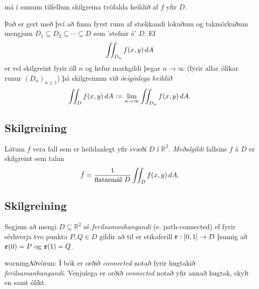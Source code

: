 \documentclass[a4paper,10pt,icelandic]{sphinxmanual}
\begin{document}
má í sumum tilfellum skilgreina tvöfalda heildið af \(f\) yfir
\(D\).

Það er gert með því að finna fyrst runu af stækkandi lokuðum og
takmörkuðum mengjum
\(D_1 \subseteq D_2 \subseteq \cdots \subseteq D\) sem ’stefnir á’
\(D\). Ef
\begin{gather}
\begin{split}\displaystyle \int\!\!\!\int_{D_n} f(x,y)\,dA\end{split}\notag
\end{gather}
er vel skilgreint fyrir öll \(n\) og hefur markgildi þegar
\(n\to \infty\) (fyrir allar ólíkar runur \((D_n)_{n\geq 1}\))
þá skilgreinum við \textit{óeiginlega heildið}
\begin{gather}
\begin{split}\displaystyle \int\!\!\!\int_{D} f(x,y)\,dA := \lim_{n\to \infty} \int\!\!\!\int_{D_n} f(x,y)\,dA .\end{split}\notag
\end{gather}

\subsection{Skilgreining}
\label{Kafli4:id8}
Látum \(f\) vera fall sem er heildanlegt yfir svæði \(D\) í
\({\mathbb  R}^2\). \emph{Meðalgildi} fallsins \(f\) á \(D\) er
skilgreint sem talan
\begin{gather}
\begin{split}\displaystyle \bar{f}=\frac{1}{\mbox{flatarmál }D}\int\!\!\!\int_D f(x,y)\,dA.\end{split}\notag
\end{gather}

\subsection{Skilgreining}
\label{Kafli4:id9}\label{Kafli4:index-6}
Segjum að mengi \(D\subseteq {\mathbb  R}^2\) sé
\emph{ferilsamanhangandi} (e. path-connected) ef fyrir sérhverja
tvo punkta \(P, Q\in D\) gildir að til er stikaferill
\(\mbox{${\bf r}$}:[0,1]\rightarrow D\) þannig að
\(\mbox{${\bf r}$}(0)=P\) og \(\mbox{${\bf r}$}(1)=Q\).

\begin{notice}{warning}{Aðvörun:}
Í bók er orðið \emph{connected} notað fyrir hugtakið \emph{ferilsamanhangandi}. Venjulega er orðið \emph{connected} notað yfir annað hugtak, skylt en samt ólíkt.
\end{notice}
\end{document}

